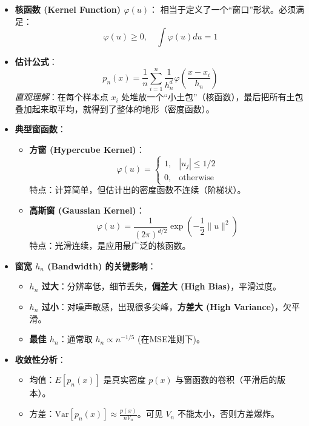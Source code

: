 \documentclass[a4paper, 11pt]{ctexart}
\begin{document}
\begin{itemize}
    \item \textbf{核函数 (Kernel Function) $\varphi(u)$}：
    相当于定义了一个“窗口”形状。必须满足：
    \[ \varphi(u) \ge 0, \quad \int \varphi(u) du = 1 \]
    
    \item \textbf{估计公式}：
    \begin{equation}
        p_n(x) = \frac{1}{n} \sum_{i=1}^n \frac{1}{h_n^d} \varphi\left(\frac{x-x_i}{h_n}\right)
    \end{equation}
    \textit{直观理解}：在每个样本点 $x_i$ 处堆放一个“小土包”（核函数），最后把所有土包叠加起来取平均，就得到了整体的地形（密度函数）。

    \item \textbf{典型窗函数}：
    \begin{itemize}
        \item \textbf{方窗 (Hypercube Kernel)}：
        \[ \varphi(u) = \begin{cases} 1, & |u_j| \le 1/2 \\ 0, & \text{otherwise} \end{cases} \]
        特点：计算简单，但估计出的密度函数不连续（阶梯状）。
        \item \textbf{高斯窗 (Gaussian Kernel)}：
        \[ \varphi(u) = \frac{1}{(2\pi)^{d/2}} \exp\left(-\frac{1}{2} \|u\|^2\right) \]
        特点：光滑连续，是应用最广泛的核函数。
    \end{itemize}

    \item \textbf{窗宽 $h_n$ (Bandwidth) 的关键影响}：
    \begin{itemize}
        \item \textbf{$h_n$ 过大}：分辨率低，细节丢失，\textbf{偏差大 (High Bias)}，平滑过度。
        \item \textbf{$h_n$ 过小}：对噪声敏感，出现很多尖峰，\textbf{方差大 (High Variance)}，欠平滑。
        \item \textbf{最佳 $h_n$}：通常取 $h_n \propto n^{-1/5}$ (在MSE准则下)。
    \end{itemize}
    
    \item \textbf{收敛性分析}：
    \begin{itemize}
        \item 均值：$E[p_n(x)]$ 是真实密度 $p(x)$ 与窗函数的卷积（平滑后的版本）。
        \item 方差：$\text{Var}[p_n(x)] \approx \frac{p(x)}{n V_n}$。可见 $V_n$ 不能太小，否则方差爆炸。
    \end{itemize}
\end{itemize}
\end{document}
